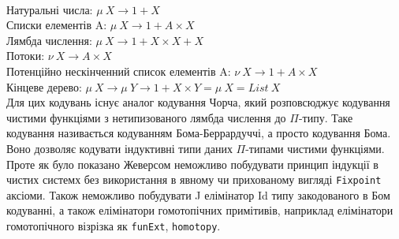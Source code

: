 \paragraph{}
\noindent Натуральні числа: $\mu\ X \rightarrow 1 + X$\\
Списки елементів A: $\mu\ X \rightarrow 1 + A \times X$\\
Лямбда числення: $\mu\ X \rightarrow 1 + X \times X + X$\\
Потоки: $\nu\ X \rightarrow A \times X$\\
Потенційно нескінченний список елементів A: $\nu\ X \rightarrow 1 + A \times X$\\
Кінцеве дерево: $\mu\ X \rightarrow \mu\ Y \rightarrow 1 + X \times Y = \mu\ X = List\ X$\\

Для цих кодувань існує аналог кодування Чорча, який розповсюджує
кодування чистими функціями з нетипизованого лямбда числення до $\Pi$-типу.
Таке кодування називається кодуванням Бома-Беррардуччі, а просто кодування Бома.
Воно дозволяє кодувати індуктивні типи даних $\Pi$-типами чистими функціями.
Проте як було показано Жеверсом\cite{Geuvers01} неможливо побудувати принцип
індукції в чистих системх без використання в явному чи прихованому
вигляді \lstinline{Fixpoint} аксіоми. Також неможливо побудувати
J елімінатор Id типу закодованого в Бом кодуванні, а також
елімінатори гомотопічних примітивів, наприклад елімінатори гомотопічного
візрізка як \lstinline{funExt}, \lstinline{homotopy}.

\newpage

